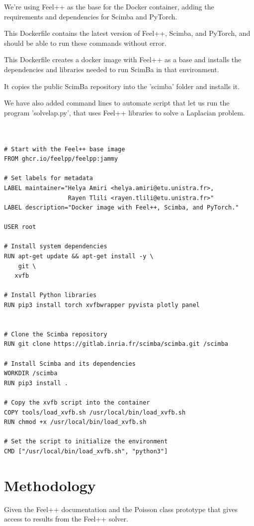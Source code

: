\documentclass[12pt]{article}
\begin{document}
\begin{enumerate}
We're using Feel++ as the base for the Docker container, adding the requirements and dependencies for Scimba and PyTorch.

This Dockerfile contains the latest version of Feel++, Scimba, and PyTorch, and should be able to run these commands without error.

This Dockerfile creates a docker image with Feel++ as a base and installs the dependencies and libraries needed to run ScimBa in that environment.

It copies the public ScimBa repository into the 'scimba' folder and installs it.

We have also added command lines to automate script that let us run the program 'solvelap.py', that uses Feel++ libraries to solve a Laplacian problem.
\newpage 

\begin{lstlisting}[language=docker,caption={Dockerfile for Feel++, Scimba, and PyTorch},frame=single, backgroundcolor=\color{gray!10}, basicstyle=\footnotesize,rulecolor=\color{blue}, framexleftmargin=3pt, commentstyle=\color{mygreen}, keywordstyle=\color{blue}]


# Start with the Feel++ base image
FROM ghcr.io/feelpp/feelpp:jammy

# Set labels for metadata
LABEL maintainer="Helya Amiri <helya.amiri@etu.unistra.fr>,
                  Rayen Tlili <rayen.tlili@etu.unistra.fr>"
LABEL description="Docker image with Feel++, Scimba, and PyTorch."

USER root

# Install system dependencies
RUN apt-get update && apt-get install -y \
    git \
   xvfb

# Install Python libraries
RUN pip3 install torch xvfbwrapper pyvista plotly panel


# Clone the Scimba repository
RUN git clone https://gitlab.inria.fr/scimba/scimba.git /scimba

# Install Scimba and its dependencies
WORKDIR /scimba
RUN pip3 install .

# Copy the xvfb script into the container
COPY tools/load_xvfb.sh /usr/local/bin/load_xvfb.sh
RUN chmod +x /usr/local/bin/load_xvfb.sh

# Set the script to initialize the environment
CMD ["/usr/local/bin/load_xvfb.sh", "python3"]
\end{lstlisting}


\newpage
\section{Methodology}
Given the Feel++ documentation and the Poisson class prototype that gives access to results from the Feel++ solver.


\end{enumerate}
\end{document}
